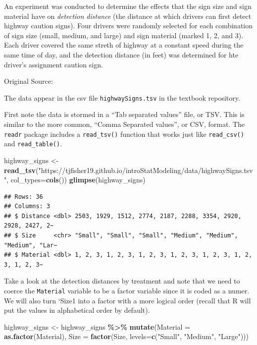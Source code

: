 \documentclass[
]{book}
\newenvironment{Shaded}{\begin{snugshade}}{\end{snugshade}}
\newcommand{\AttributeTok}[1]{\textcolor[rgb]{0.13,0.29,0.53}{#1}}
\newcommand{\FunctionTok}[1]{\textcolor[rgb]{0.13,0.29,0.53}{\textbf{#1}}}
\newcommand{\NormalTok}[1]{#1}
\newcommand{\OtherTok}[1]{\textcolor[rgb]{0.56,0.35,0.01}{#1}}
\newcommand{\SpecialCharTok}[1]{\textcolor[rgb]{0.81,0.36,0.00}{\textbf{#1}}}
\newcommand{\StringTok}[1]{\textcolor[rgb]{0.31,0.60,0.02}{#1}}
\begin{document}
An experiment was conducted to determine the effects that the sign size and sign material have on \emph{detection distance} (the distance at which drivers can first detect highway caution signs).
Four drivers were randomly selected for each combination of sign size (small, medium, and large) and sign material (marked 1, 2, and 3).
Each driver covered the same streth of highway at a constant speed during the same time of day, and the detection distance (in feet) was determined for hte driver's assignment caution sign.

Original Source: \citet{Younes1994}

The data appear in the csv file \texttt{highwaySigns.tsv} in the textbook repository.

First note the data is stormed in a ``Tab separated values'' file, or TSV.
This is similar to the more common, ``Comma Separated values'', or CSV, format.
The \texttt{readr} package includes a \texttt{read\_tsv()} function that works just like \texttt{read\_csv()} and \texttt{read\_table()}.

\begin{Shaded}
\begin{Highlighting}[]
\NormalTok{highway\_signs }\OtherTok{\textless{}{-}} \FunctionTok{read\_tsv}\NormalTok{(}\StringTok{"https://tjfisher19.github.io/introStatModeling/data/highwaySigns.tsv"}\NormalTok{, }\AttributeTok{col\_types=}\FunctionTok{cols}\NormalTok{())}
\FunctionTok{glimpse}\NormalTok{(highway\_signs)}
\end{Highlighting}
\end{Shaded}

\begin{verbatim}
## Rows: 36
## Columns: 3
## $ Distance <dbl> 2503, 1929, 1512, 2774, 2187, 2288, 3354, 2920, 2928, 2427, 2~
## $ Size     <chr> "Small", "Small", "Small", "Medium", "Medium", "Medium", "Lar~
## $ Material <dbl> 1, 2, 3, 1, 2, 3, 1, 2, 3, 1, 2, 3, 1, 2, 3, 1, 2, 3, 1, 2, 3~
\end{verbatim}

Take a look at the detection distances by treatment and note that we need to coerce the \texttt{Material} variable to be a factor variable since it is coded as a numer.
We will also turn `Size1 into a factor with a more logical order (recall that R will put the values in alphabetical order by default).

\begin{Shaded}
\begin{Highlighting}[]
\NormalTok{highway\_signs }\OtherTok{\textless{}{-}}\NormalTok{ highway\_signs }\SpecialCharTok{\%\textgreater{}\%}
  \FunctionTok{mutate}\NormalTok{(}\AttributeTok{Material =} \FunctionTok{as.factor}\NormalTok{(Material),}
         \AttributeTok{Size =} \FunctionTok{factor}\NormalTok{(Size, }\AttributeTok{levels=}\FunctionTok{c}\NormalTok{(}\StringTok{"Small"}\NormalTok{, }\StringTok{"Medium"}\NormalTok{, }\StringTok{"Large"}\NormalTok{)))}
\end{Highlighting}
\end{Shaded}
\end{document}
